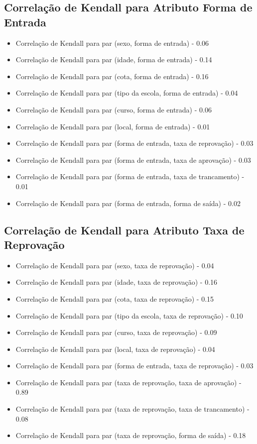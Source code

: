 \subsection{Correlação de Kendall para Atributo Forma de Entrada}
\begin{itemize}
    \item Correlação de Kendall para par (sexo, forma de entrada) - 0.06
    \item Correlação de Kendall para par (idade, forma de entrada) - 0.14
    \item Correlação de Kendall para par (cota, forma de entrada) - 0.16
    \item Correlação de Kendall para par (tipo da escola, forma de entrada) - 0.04
    \item Correlação de Kendall para par (curso, forma de entrada) - 0.06
    \item Correlação de Kendall para par (local, forma de entrada) - 0.01
    \item Correlação de Kendall para par (forma de entrada, taxa de reprovação) - 0.03
    \item Correlação de Kendall para par (forma de entrada, taxa de aprovação) - 0.03
    \item Correlação de Kendall para par (forma de entrada, taxa de trancamento) - 0.01
    \item Correlação de Kendall para par (forma de entrada, forma de saída) - 0.02
\end{itemize}

\subsection{Correlação de Kendall para Atributo Taxa de Reprovação}
\begin{itemize}
    \item Correlação de Kendall para par (sexo, taxa de reprovação) - 0.04
    \item Correlação de Kendall para par (idade, taxa de reprovação) - 0.16
    \item Correlação de Kendall para par (cota, taxa de reprovação) - 0.15
    \item Correlação de Kendall para par (tipo da escola, taxa de reprovação) - 0.10
    \item Correlação de Kendall para par (curso, taxa de reprovação) - 0.09
    \item Correlação de Kendall para par (local, taxa de reprovação) - 0.04
    \item Correlação de Kendall para par (forma de entrada, taxa de reprovação) - 0.03
    \item Correlação de Kendall para par (taxa de reprovação, taxa de aprovação) - 0.89
    \item Correlação de Kendall para par (taxa de reprovação, taxa de trancamento) - 0.08
    \item Correlação de Kendall para par (taxa de reprovação, forma de saída) - 0.18
\end{itemize}

